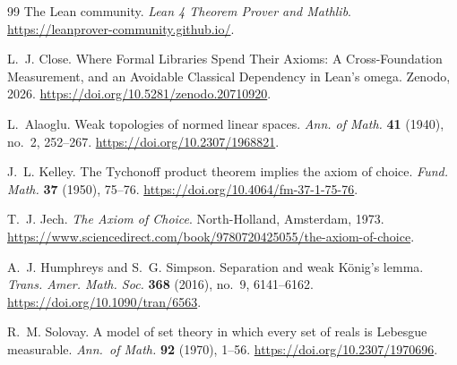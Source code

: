 \documentclass[11pt,reqno]{amsart}
\theoremstyle{redplain}
\begin{document}
\begin{thebibliography}{99}
 The Lean community. \newblock \emph{Lean 4 Theorem Prover
and Mathlib}. \newblock \url{https://leanprover-community.github.io/}.

 L.~J. Close. \newblock Where Formal Libraries Spend
Their Axioms: A Cross-Foundation Measurement, and an Avoidable Classical
Dependency in Lean's omega. \newblock Zenodo, 2026. \newblock %
\url{https://doi.org/10.5281/zenodo.20710920}.

 L.~Alaoglu. \newblock Weak topologies of normed linear
spaces. \newblock \emph{Ann. of Math.} \textbf{41} (1940), no.~2, 252--267. %
\newblock \url{https://doi.org/10.2307/1968821}.

 J.~L. Kelley. \newblock The Tychonoff product theorem
implies the axiom of choice. \newblock \emph{Fund. Math.} \textbf{37}
(1950), 75--76. \newblock \url{https://doi.org/10.4064/fm-37-1-75-76}.

 T.~J. Jech. \newblock \emph{The Axiom of Choice}. %
\newblock North-Holland, Amsterdam, 1973. \newblock
\url{https://www.sciencedirect.com/book/9780720425055/the-axiom-of-choice}.

 A.~J. Humphreys and S.~G. Simpson. \newblock %
Separation and weak K\"onig's lemma. \newblock \emph{Trans. Amer. Math. Soc.}
\textbf{368} (2016), no.~9, 6141--6162. \newblock %
\url{https://doi.org/10.1090/tran/6563}.

 R.~M. Solovay. \newblock A model of set theory in
which every set of reals is Lebesgue measurable. \newblock\emph{Ann.\ of
Math.} \textbf{92} (1970), 1--56. \newblock%
\url{https://doi.org/10.2307/1970696}.
\end{thebibliography}
\end{document}
